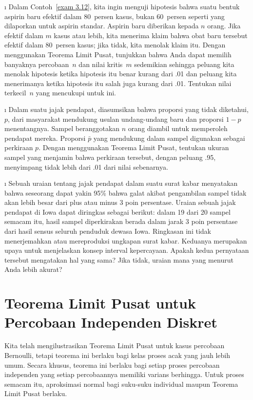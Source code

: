 \begin{LJSItem}
\i\label{exer 9.1.16}  Dalam Contoh~\ref{exam 3.12}, kita ingin menguji
hipotesis bahwa suatu bentuk aspirin baru efektif dalam 80~persen kasus,
bukan 60~persen seperti yang dilaporkan untuk aspirin standar.  Aspirin
baru diberikan kepada $n$ orang.  Jika efektif dalam $m$ kasus atau lebih,
kita menerima klaim bahwa obat baru tersebut efektif dalam 80~persen kasus;
jika tidak, kita menolak klaim itu.  Dengan menggunakan Teorema Limit Pusat, tunjukkan bahwa Anda dapat
memilih banyaknya percobaan~$n$ dan nilai kritis~$m$ sedemikian sehingga
peluang kita menolak hipotesis ketika hipotesis itu benar kurang dari .01 dan
peluang kita menerimanya ketika hipotesis itu salah juga kurang dari .01.  Tentukan
nilai terkecil~$n$ yang mencukupi untuk ini.

\i\label{exer 9.1.17}  Dalam suatu jajak pendapat, diasumsikan bahwa proporsi yang tidak diketahui, $p$,
dari masyarakat mendukung usulan undang-undang baru dan proporsi $1-p$ menentangnya.
Sampel beranggotakan $n$ orang diambil untuk memperoleh pendapat mereka.  Proporsi ${\bar
p}$ yang mendukung dalam sampel digunakan sebagai perkiraan $p$.  Dengan menggunakan Teorema Limit
Pusat, tentukan ukuran sampel yang menjamin bahwa perkiraan tersebut, dengan
peluang .95, menyimpang tidak lebih dari .01 dari nilai sebenarnya.

\i\label{exer 9.1.18} 
Sebuah uraian tentang jajak pendapat dalam suatu surat kabar menyatakan bahwa seseorang dapat 
yakin 95\% bahwa galat akibat pengambilan sampel tidak akan lebih besar 
dari plus atau minus 3 poin persentase.  Uraian sebuah jajak pendapat
 di Iowa dapat diringkas sebagai berikut:
dalam 19 dari 20 sampel semacam itu, hasil sampel diperkirakan berada dalam jarak
3 poin persentase dari hasil sensus seluruh penduduk dewasa Iowa. Ringkasan ini tidak
menerjemahkan atau mereproduksi ungkapan surat kabar. Keduanya merupakan upaya 
untuk menjelaskan konsep interval kepercayaan.  Apakah kedua pernyataan tersebut
mengatakan hal yang sama?  Jika tidak, uraian mana yang menurut Anda 
lebih akurat? 

\end{LJSItem}

\section[Percobaan Independen Diskret]{\bf Teorema Limit Pusat untuk Percobaan Independen Diskret}\label{sec 9.3}
Kita telah mengilustrasikan Teorema Limit Pusat untuk kasus percobaan Bernoulli, tetapi
teorema ini berlaku bagi kelas proses acak yang jauh lebih umum.  Secara khusus,
teorema ini berlaku bagi setiap proses percobaan independen yang setiap percobaannya
memiliki varians berhingga.  Untuk proses semacam itu, aproksimasi normal bagi suku-suku
individual maupun Teorema Limit Pusat berlaku.

